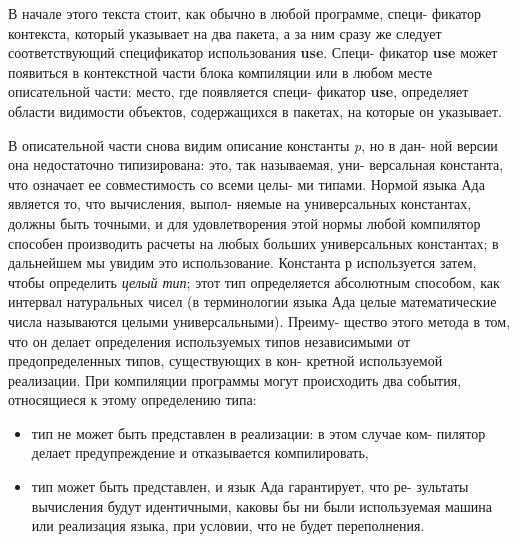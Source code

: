 В начале этого текста стоит, как обычно в любой программе, специ­-\linebreak
фикатор контекста, который указывает на два пакета, а за ним сразу\linebreak
же следует соответствующий спецификатор использования {\bf use}. Специ­-\linebreak
фикатор {\bf use} может появиться в контекстной части блока компиляции\linebreak
или в любом месте описательной части: место, где появляется специ­-\linebreak
фикатор {\bf use}, определяет области видимости объектов, содержащихся\linebreak
в пакетах, на которые он указывает.

В описательной части снова видим описание константы {\it p}, но в дан­-\linebreak
ной версии она недостаточно типизирована: это, так называемая, уни­-\linebreak
версальная константа, что означает ее совместимость со всеми целы­-\linebreak
ми типами. Нормой языка Ада является то, что вычисления, выпол­-\linebreak
няемые на универсальных константах, должны быть точными, и для\linebreak
удовлетворения этой нормы любой компилятор способен производить\linebreak
расчеты на любых больших универсальных константах; в дальнейшем\linebreak
мы увидим это использование. Константа р используется затем, чтобы\linebreak
определить {\it целый тип}; этот тип определяется абсолютным способом,\linebreak
как интервал натуральных чисел (в терминологии языка Ада целые\linebreak
математические числа называются целыми универсальными). Преиму­-\linebreak
щество этого метода в том, что он делает определения используемых\linebreak
типов независимыми от предопределенных типов, существующих в кон­-\linebreak
кретной используемой реализации. При компиляции программы могут\linebreak
происходить два события, относящиеся к этому определению типа:
\begin{itemize}
\item тип не может быть представлен в реализации: в этом случае ком­-\linebreak
пилятор делает предупреждение и отказывается компилировать,\linebreak
\item тип может быть представлен, и язык Ада гарантирует, что ре­-\linebreak
зультаты вычисления будут идентичными, каковы бы ни были\linebreak
\newpage
используемая машина или реализация языка, при условии, что не\linebreak
будет переполнения.
\end{itemize}
